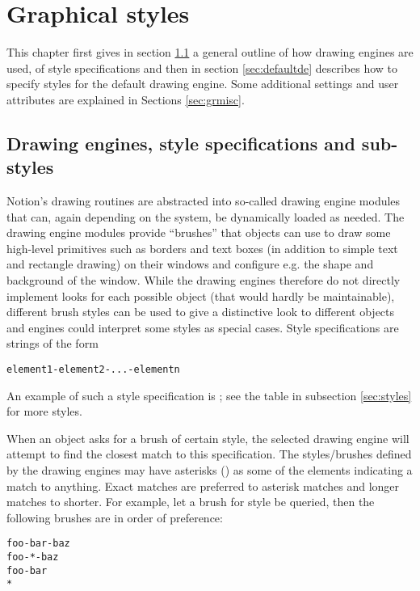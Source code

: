 
\chapter{Graphical styles}
\label{chap:gr}

This chapter first gives in section \ref{sec:engines} a general outline 
of how drawing engines are used, of style specifications and then
in section \ref{sec:defaultde} describes how to specify styles
for the default drawing engine. Some additional settings and
user attributes are explained in Sections \ref{sec:grmisc}.


\section{Drawing engines, style specifications and sub-styles}
\label{sec:engines}

Notion's drawing routines are abstracted into so-called drawing engine
modules that can, again depending on the system, be dynamically
loaded as needed. The drawing engine modules provide ``brushes''
that objects can use to draw some high-level primitives such
as borders and text boxes (in addition to simple text and rectangle
drawing) on their windows and configure e.g. the shape and 
background of the window. While the drawing engines therefore
do not directly implement looks for each possible object (that
would hardly be maintainable), different brush styles can be
used to give a distinctive look to different objects and engines
could interpret some styles as special cases. Style specifications 
are strings of the form

\begin{verbatim}
element1-element2-...-elementn
\end{verbatim}

An example of such a style specification is ;
see the table in subsection \ref{sec:styles} for more styles.

When an object asks for a brush of certain style, the selected
drawing engine will attempt to find the closest match to this
specification. The styles/brushes defined by the drawing engines 
may have asterisks (\codestr{*}) as some of the elements indicating
a match to anything. Exact matches are preferred to asterisk
matches and longer matches to shorter. For example, let a brush
for style  be queried, then the following
brushes are in order of preference:

\begin{verbatim}
foo-bar-baz
foo-*-baz
foo-bar
*
\end{verbatim}

